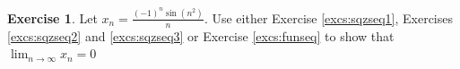 \documentclass[english]{book}
\newtheorem{corollary}[theorem]{Corollary}
\theoremstyle{remark}
\theoremstyle{definition}
\newtheorem{excs}{Exercise}[chapter]
\newtheorem{definition}[theorem]{Definition}
\newtheorem*{next week}{Next Week}
\newcommand{\dlim}{\displaystyle\lim}
\begin{document}
\begin{excs}
	Let $x_n= \frac{(-1)^n\sin(n^2)}{n}$. Use either Exercise \ref{excs:sqzseq1}, Exercises \ref{excs:sqzseq2} and \ref{excs:sqzseq3} or Exercise \ref{excs:funseq} to show that $\dlim_{n\to \infty}x_n=0$
\end{excs}
\end{document}

